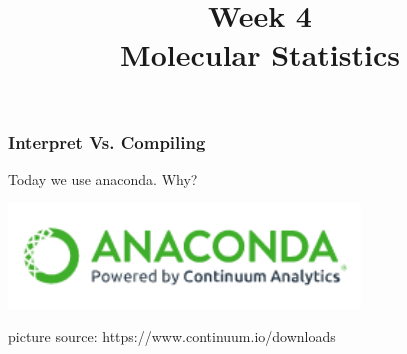 

\usepackage{soul}

\title[]{Week 4\\Molecular Statistics}








{
\usebackgroundtemplate{}
\begin{frame}[plain]
    \titlepage
    \addtocounter{framenumber}{-1}
\end{frame}
}

%
%
%
%
%
%
%
%
%

\begin{frame}[fragile]
    \frametitle{Interpret Vs. Compiling}

    \centering

    Today we use anaconda. Why?

 \includegraphics[width=0.7\textwidth]{images/anaconda.png}

%
%
%

    {
        \scriptsize
        picture source: https://www.continuum.io/downloads}

\end{frame}



